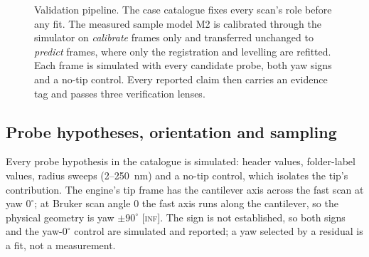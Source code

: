 \documentclass[preprint,12pt]{elsarticle}
\newcommand{\tagi}{\textsc{[inf]}}
\begin{document}
\begin{figure}[t]
\centering
{}
\caption{Validation pipeline. The case catalogue fixes every scan's role before any fit. The
measured sample model M2 is calibrated through the simulator on \emph{calibrate} frames only and
transferred unchanged to \emph{predict} frames, where only the registration and levelling are
refitted. Each frame is simulated with every candidate probe, both yaw signs and a no-tip control.
Every reported claim then carries an evidence tag and passes three verification lenses.}
\label{fig:workflow}
\end{figure}

\subsection{Probe hypotheses, orientation and sampling}

Every probe hypothesis in the catalogue is simulated: header values, folder-label values, radius
sweeps (2--250~nm) and a no-tip control, which isolates the tip's contribution. The engine's tip
frame has the cantilever axis across the fast scan at yaw $0^\circ$; at Bruker scan angle 0 the
fast axis runs along the cantilever, so the physical geometry is yaw $\pm 90^\circ$
\tagi. The sign is not established, so both signs and the yaw-$0^\circ$ control are simulated and
reported; a yaw selected by a residual is a fit, not a measurement.
\end{document}
